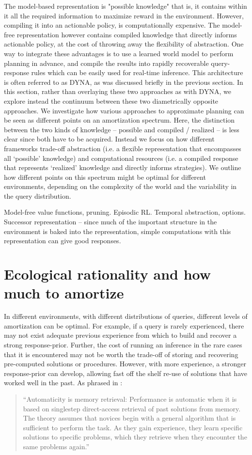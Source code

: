 The model-based representation is "possible knowledge" that is, it contains within it all the required information to maximize reward in the environment. However, compiling it into an actionable policy, is computationally expensive. The model-free representation however contains compiled knowledge that directly informs actionable policy, at the cost of throwing away the flexibility of abstraction. One way to integrate these advantages is to use a learned world model to perform planning in advance, and compile the results into rapidly recoverable query-response rules which can be easily used for real-time inference. This architecture is often referred to as DYNA, as was discussed briefly in the previous section. In this section, rather than overlaying these two approaches as with DYNA, we explore instead the continuum between these two diametrically opposite approaches. We investigate how various approaches to approximate planning can be seen as different points on an amortization spectrum. Here, the distinction between the two kinds of knowledge -- possible and compiled / realized -- is less clear since both have to be acquired. Instead we focus on how different frameworks trade-off abstraction (i.e. a flexible representation that encompasses all `possible' knowledge) and computational resources (i.e. a compiled response that represents `realized' knowledge and directly informs strategies). We outline how different points on this spectrum might be optimal for different environments, depending on the complexity of the world and the variability in the query distribution.

Model-free value functions, pruning. Episodic RL.
Temporal abstraction, options. Successor representation -- since much of the important structure in the environment is baked into the representation, simple computations with this representation can give good responses. 

\section{Ecological rationality and how much to amortize}

In different environments, with different distributions of queries, different levels of amortization can be optimal. For example, if a query is rarely experienced, there may not exist adequate previous experience from which to build and recover a strong response-prior. Further, the cost of running an inference in the rare cases that it is encountered may not be worth the trade-off of storing and recovering pre-computed solutions or procedures. However, with more experience, a stronger response-prior can develop, allowing fast off the shelf re-use of solutions that have worked well in the past. As phrased in \cite{logan1988toward}:
\begin{quote}
``Automaticity is memory retrieval: Performance is automatic when it is based on singlestep direct-access retrieval of past solutions from memory. The theory assumes that novices begin with a general algorithm that is sufficient to perform the task. As they gain experience, they learn specific solutions to specific problems, which they retrieve when they encounter the same problems again.''
\end{quote}

